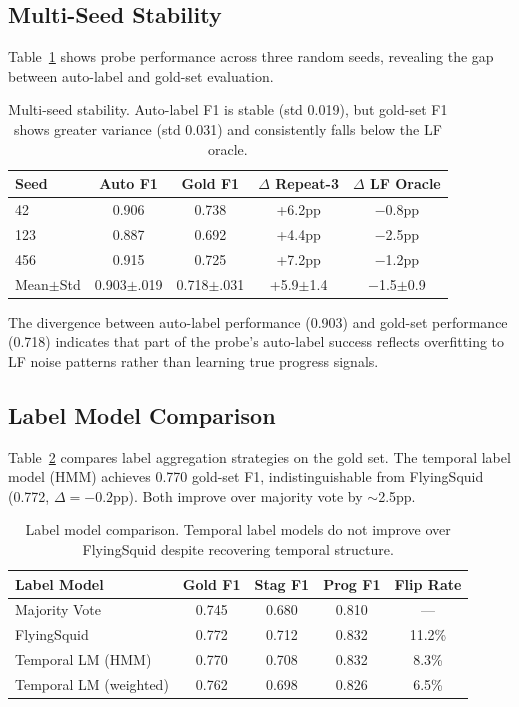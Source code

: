 \documentclass[11pt,a4paper]{article}
\begin{document}
\subsection{Multi-Seed Stability}

Table~\ref{tab:multiseed} shows probe performance across three random seeds, revealing the gap between auto-label and gold-set evaluation.

\begin{table}[t]
\centering
\small
\begin{tabular}{lcccc}
\toprule
\textbf{Seed} & \textbf{Auto F1} & \textbf{Gold F1} & \textbf{$\Delta$ Repeat-3} & \textbf{$\Delta$ LF Oracle} \\
\midrule
42 & 0.906 & 0.738 & +6.2pp & $-$0.8pp \\
123 & 0.887 & 0.692 & +4.4pp & $-$2.5pp \\
456 & 0.915 & 0.725 & +7.2pp & $-$1.2pp \\
\midrule
Mean$\pm$Std & 0.903$\pm$.019 & 0.718$\pm$.031 & +5.9$\pm$1.4 & $-$1.5$\pm$0.9 \\
\bottomrule
\end{tabular}
\caption{Multi-seed stability. Auto-label F1 is stable (std 0.019), but gold-set F1 shows greater variance (std 0.031) and consistently falls below the LF oracle.}
\label{tab:multiseed}
\end{table}

The divergence between auto-label performance (0.903) and gold-set performance (0.718) indicates that part of the probe's auto-label success reflects overfitting to LF noise patterns rather than learning true progress signals.

\subsection{Label Model Comparison}
\label{sec:label-model-comparison}

Table~\ref{tab:label-model} compares label aggregation strategies on the gold set. The temporal label model (HMM) achieves 0.770 gold-set F1, indistinguishable from FlyingSquid (0.772, $\Delta{=}{-}0.2$pp). Both improve over majority vote by ${\sim}$2.5pp.

\begin{table}[t]
\centering
\small
\begin{tabular}{lcccc}
\toprule
\textbf{Label Model} & \textbf{Gold F1} & \textbf{Stag F1} & \textbf{Prog F1} & \textbf{Flip Rate} \\
\midrule
Majority Vote & 0.745 & 0.680 & 0.810 & --- \\
FlyingSquid & 0.772 & 0.712 & 0.832 & 11.2\% \\
Temporal LM (HMM) & 0.770 & 0.708 & 0.832 & 8.3\% \\
Temporal LM (weighted) & 0.762 & 0.698 & 0.826 & 6.5\% \\
\bottomrule
\end{tabular}
\caption{Label model comparison. Temporal label models do not improve over FlyingSquid despite recovering temporal structure.}
\label{tab:label-model}
\end{table}
\end{document}
